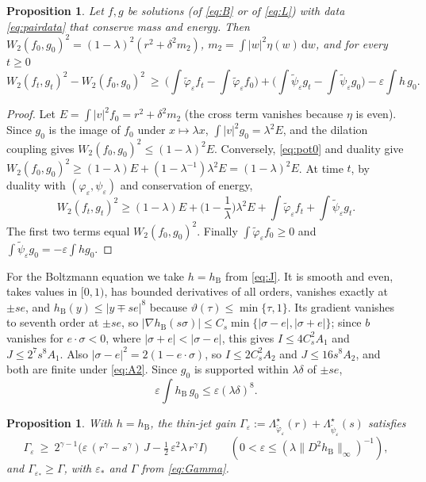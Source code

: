 \documentclass[11pt]{amsart}
\newtheorem{proposition}[theorem]{Proposition}
\theoremstyle{definition}
\newcommand{\dd}{\,\mathrm{d}}
\newcommand{\hB}{h_{\mathrm B}}
\begin{document}
\begin{proposition}\label{prop:master}
Let $f,g$ be solutions (of \eqref{eq:B} or of \eqref{eq:L}) with data \eqref{eq:pairdata} that conserve mass and energy. Then $W_2(f_0,g_0)^2=(1-\lambda)^2(r^2+\delta^2m_2)$, $m_2=\int|w|^2\eta(w)\dd w$, and for every $t\ge0$
\begin{equation}\label{eq:master}
W_2(f_t,g_t)^2-W_2(f_0,g_0)^2\ \ge\ \Big(\int\tilde\varphi_\varepsilon f_t-\int\tilde\varphi_\varepsilon f_0\Big)+\Big(\int\tilde\psi_\varepsilon g_t-\int\tilde\psi_\varepsilon g_0\Big)-\varepsilon\int h\,g_0 .
\end{equation}
\end{proposition}

\begin{proof}
Let $E=\int|v|^2f_0=r^2+\delta^2m_2$ (the cross term vanishes because $\eta$ is even). Since $g_0$ is the image of $f_0$ under $x\mapsto\lambda x$, $\int|v|^2g_0=\lambda^2E$, and the dilation coupling gives $W_2(f_0,g_0)^2\le(1-\lambda)^2E$. Conversely, \eqref{eq:pot0} and duality give $W_2(f_0,g_0)^2\ge(1-\lambda)E+(1-\lambda^{-1})\lambda^2E=(1-\lambda)^2E$. At time $t$, by duality with $(\varphi_\varepsilon,\psi_\varepsilon)$ and conservation of energy,
\[
W_2(f_t,g_t)^2\ge(1-\lambda)E+\Big(1-\frac1\lambda\Big)\lambda^2E+\int\tilde\varphi_\varepsilon f_t+\int\tilde\psi_\varepsilon g_t .
\]
The first two terms equal $W_2(f_0,g_0)^2$. Finally $\int\tilde\varphi_\varepsilon f_0\ge0$ and $\int\tilde\psi_\varepsilon g_0=-\varepsilon\int hg_0$.
\end{proof}

For the Boltzmann equation we take $h=\hB$ from \eqref{eq:J}. It is smooth and even, takes values in $[0,1)$, has bounded derivatives of all orders, vanishes exactly at $\pm se$, and $\hB(y)\le|y\mp se|^8$ because $\vartheta(\tau)\le\min\{\tau,1\}$. Its gradient vanishes to seventh order at $\pm se$, so $|\nabla\hB(s\sigma)|\le C_s\min\{|\sigma-e|,|\sigma+e|\}$; since $b$ vanishes for $e\cdot\sigma<0$, where $|\sigma+e|<|\sigma-e|$, this gives $I\le4C_s^2A_1$ and $J\le2^7s^8A_1$. Also $|\sigma-e|^2=2(1-e\cdot\sigma)$, so $I\le2C_s^2A_2$ and $J\le16s^8A_2$, and both are finite under \eqref{eq:A2}. Since $g_0$ is supported within $\lambda\delta$ of $\pm se$,
\begin{equation}\label{eq:deficitB}
\varepsilon\int\hB\, g_0\le\varepsilon(\lambda\delta)^8 .
\end{equation}

\begin{proposition}\label{prop:gain}
With $h=\hB$, the thin-jet gain $\Gamma_\varepsilon:=\Lambda^\star_{\tilde\varphi_\varepsilon}(r)+\Lambda^\star_{\tilde\psi_\varepsilon}(s)$ satisfies
\[
\Gamma_\varepsilon\ \ge\ 2^{\gamma-1}\Big(\varepsilon\,(r^\gamma-s^\gamma)\,J-\tfrac12\,\varepsilon^2\lambda\, r^\gamma I\Big)\qquad(0<\varepsilon\le(\lambda\|D^2\hB\|_\infty)^{-1}),
\]
and $\Gamma_{\varepsilon_*}\ge\Gamma$, with $\varepsilon_*$ and $\Gamma$ from \eqref{eq:Gamma}.
\end{proposition}
\end{document}

